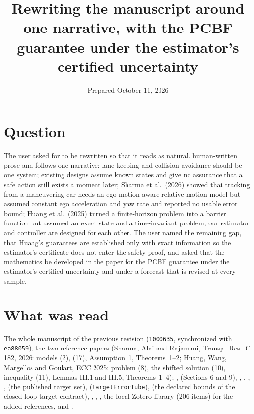 \documentclass[11pt]{article}
\title{Rewriting the manuscript around one narrative, with the PCBF guarantee
under the estimator's certified uncertainty}
\date{Prepared October 11, 2026}
\begin{document}
\maketitle

\section{Question}
The user asked for  to be rewritten so that it reads
as natural, human-written prose and follows one narrative: lane keeping and
collision avoidance should be one system; existing designs assume known states
and give no assurance that a safe action still exists a moment later; Sharma
et al.\ (2026) showed that tracking from a maneuvering car needs an
ego-motion-aware relative motion model but assumed constant ego acceleration
and yaw rate and reported no usable error bound; Huang et al.\ (2025) turned a
finite-horizon problem into a barrier function but assumed an exact state and
a time-invariant problem; our estimator and controller are designed for each
other. The user named the remaining gap, that Huang's guarantees are
established only with exact information so the estimator's certificate does
not enter the safety proof, and asked that the mathematics be developed in
the paper for the PCBF guarantee under the estimator's certified uncertainty
and under a forecast that is revised at every sample.

\section{What was read}
The whole manuscript of the previous revision (\texttt{1000635}, synchronized
with \texttt{ea88059}); the two reference papers (Sharma, Alai and Rajamani,
Transp.\ Res.\ C 182, 2026: models (2), (17), Assumption~1, Theorems~1--2;
Huang, Wang, Margellos and Goulart, ECC 2025: problem (8), the shifted
solution (10), inequality (11), Lemmas III.1 and III.5, Theorems~1--4);
,
 (Sections 6 and 9),
, ,
, ,
 (the published target set),
 (\texttt{targetErrorTube}),
 (the declared bounds of the
closed-loop target contract), , ,
, the local Zotero library (206 items) for the added
references, and .
\end{document}
